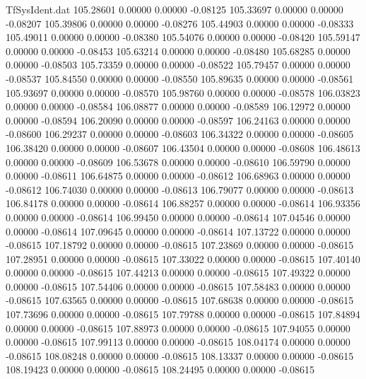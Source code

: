 \begin{filecontents}{TfSysIdent.dat}
 105.28601    0.00000    0.00000   -0.08125
 105.33697    0.00000    0.00000   -0.08207
 105.39806    0.00000    0.00000   -0.08276
 105.44903    0.00000    0.00000   -0.08333
 105.49011    0.00000    0.00000   -0.08380
 105.54076    0.00000    0.00000   -0.08420
 105.59147    0.00000    0.00000   -0.08453
 105.63214    0.00000    0.00000   -0.08480
 105.68285    0.00000    0.00000   -0.08503
 105.73359    0.00000    0.00000   -0.08522
 105.79457    0.00000    0.00000   -0.08537
 105.84550    0.00000    0.00000   -0.08550
 105.89635    0.00000    0.00000   -0.08561
 105.93697    0.00000    0.00000   -0.08570
 105.98760    0.00000    0.00000   -0.08578
 106.03823    0.00000    0.00000   -0.08584
 106.08877    0.00000    0.00000   -0.08589
 106.12972    0.00000    0.00000   -0.08594
 106.20090    0.00000    0.00000   -0.08597
 106.24163    0.00000    0.00000   -0.08600
 106.29237    0.00000    0.00000   -0.08603
 106.34322    0.00000    0.00000   -0.08605
 106.38420    0.00000    0.00000   -0.08607
 106.43504    0.00000    0.00000   -0.08608
 106.48613    0.00000    0.00000   -0.08609
 106.53678    0.00000    0.00000   -0.08610
 106.59790    0.00000    0.00000   -0.08611
 106.64875    0.00000    0.00000   -0.08612
 106.68963    0.00000    0.00000   -0.08612
 106.74030    0.00000    0.00000   -0.08613
 106.79077    0.00000    0.00000   -0.08613
 106.84178    0.00000    0.00000   -0.08614
 106.88257    0.00000    0.00000   -0.08614
 106.93356    0.00000    0.00000   -0.08614
 106.99450    0.00000    0.00000   -0.08614
 107.04546    0.00000    0.00000   -0.08614
 107.09645    0.00000    0.00000   -0.08614
 107.13722    0.00000    0.00000   -0.08615
 107.18792    0.00000    0.00000   -0.08615
 107.23869    0.00000    0.00000   -0.08615
 107.28951    0.00000    0.00000   -0.08615
 107.33022    0.00000    0.00000   -0.08615
 107.40140    0.00000    0.00000   -0.08615
 107.44213    0.00000    0.00000   -0.08615
 107.49322    0.00000    0.00000   -0.08615
 107.54406    0.00000    0.00000   -0.08615
 107.58483    0.00000    0.00000   -0.08615
 107.63565    0.00000    0.00000   -0.08615
 107.68638    0.00000    0.00000   -0.08615
 107.73696    0.00000    0.00000   -0.08615
 107.79788    0.00000    0.00000   -0.08615
 107.84894    0.00000    0.00000   -0.08615
 107.88973    0.00000    0.00000   -0.08615
 107.94055    0.00000    0.00000   -0.08615
 107.99113    0.00000    0.00000   -0.08615
 108.04174    0.00000    0.00000   -0.08615
 108.08248    0.00000    0.00000   -0.08615
 108.13337    0.00000    0.00000   -0.08615
 108.19423    0.00000    0.00000   -0.08615
 108.24495    0.00000    0.00000   -0.08615

\end{filecontents}
